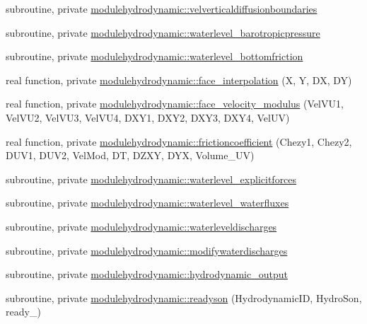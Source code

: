 \begin{DoxyCompactItemize}
\item 
subroutine, private \mbox{\hyperlink{namespacemodulehydrodynamic_a10da15941f53c4274a4bfa5fec56a6ad}{modulehydrodynamic\+::velverticaldiffusionboundaries}}
\item 
subroutine, private \mbox{\hyperlink{namespacemodulehydrodynamic_a5e6cdcb5121c8a2db4d545b07bfd4d73}{modulehydrodynamic\+::waterlevel\+\_\+barotropicpressure}}
\item 
subroutine, private \mbox{\hyperlink{namespacemodulehydrodynamic_ae585f218a774bfbfdd6f830f47de4d2a}{modulehydrodynamic\+::waterlevel\+\_\+bottomfriction}}
\item 
real function, private \mbox{\hyperlink{namespacemodulehydrodynamic_aeaeab24d9e7539d66950b61105ead64f}{modulehydrodynamic\+::face\+\_\+interpolation}} (X, Y, DX, DY)
\item 
real function, private \mbox{\hyperlink{namespacemodulehydrodynamic_a59e16bb385ccdef967139d17eb850973}{modulehydrodynamic\+::face\+\_\+velocity\+\_\+modulus}} (Vel\+V\+U1, Vel\+V\+U2, Vel\+V\+U3, Vel\+V\+U4, D\+X\+Y1, D\+X\+Y2, D\+X\+Y3, D\+X\+Y4, Vel\+UV)
\item 
real function, private \mbox{\hyperlink{namespacemodulehydrodynamic_aa1565fcf41a2baafe5216a3a1a3a963f}{modulehydrodynamic\+::frictioncoefficient}} (Chezy1, Chezy2, D\+U\+V1, D\+U\+V2, Vel\+Mod, DT, D\+Z\+XY, D\+YX, Volume\+\_\+\+UV)
\item 
subroutine, private \mbox{\hyperlink{namespacemodulehydrodynamic_a8f55c0f844c6c92f25d99d0c16b764df}{modulehydrodynamic\+::waterlevel\+\_\+explicitforces}}
\item 
subroutine, private \mbox{\hyperlink{namespacemodulehydrodynamic_a592aa79c419a6f5815c5df5a4b4548a9}{modulehydrodynamic\+::waterlevel\+\_\+waterfluxes}}
\item 
subroutine, private \mbox{\hyperlink{namespacemodulehydrodynamic_a644daa49a5aa05490db0fd5dae3af00c}{modulehydrodynamic\+::waterleveldischarges}}
\item 
subroutine, private \mbox{\hyperlink{namespacemodulehydrodynamic_a3efd394333f3dd01635ae28bbea6dd28}{modulehydrodynamic\+::modifywaterdischarges}}
\item 
subroutine, private \mbox{\hyperlink{namespacemodulehydrodynamic_a60b8585327586b632ce2934f2676df87}{modulehydrodynamic\+::hydrodynamic\+\_\+output}}
\item 
subroutine, private \mbox{\hyperlink{namespacemodulehydrodynamic_a89980d9805db3770c7583bdefe7730fa}{modulehydrodynamic\+::readyson}} (Hydrodynamic\+ID, Hydro\+Son, ready\+\_\+)

\end{DoxyCompactItemize}
